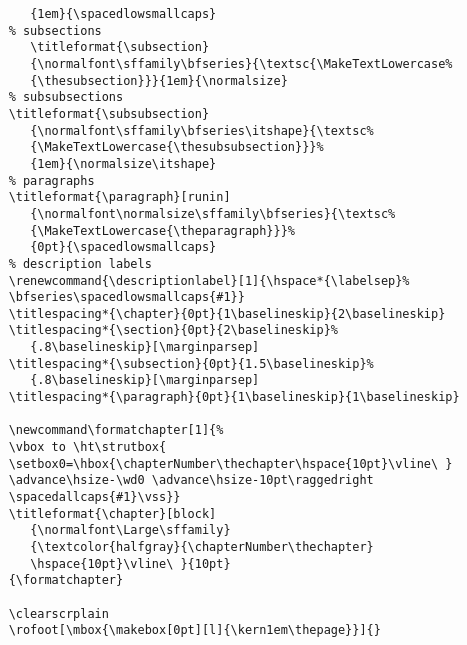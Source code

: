 \begin{lstlisting}
       {1em}{\spacedlowsmallcaps}
    % subsections
       \titleformat{\subsection}
       {\normalfont\sffamily\bfseries}{\textsc{\MakeTextLowercase%
       {\thesubsection}}}{1em}{\normalsize}
    % subsubsections
    \titleformat{\subsubsection}
       {\normalfont\sffamily\bfseries\itshape}{\textsc%
       {\MakeTextLowercase{\thesubsubsection}}}%
       {1em}{\normalsize\itshape}
    % paragraphs
    \titleformat{\paragraph}[runin]
       {\normalfont\normalsize\sffamily\bfseries}{\textsc%
       {\MakeTextLowercase{\theparagraph}}}%
       {0pt}{\spacedlowsmallcaps}
    % description labels
    \renewcommand{\descriptionlabel}[1]{\hspace*{\labelsep}%
    \bfseries\spacedlowsmallcaps{#1}}
    \titlespacing*{\chapter}{0pt}{1\baselineskip}{2\baselineskip}
    \titlespacing*{\section}{0pt}{2\baselineskip}%
       {.8\baselineskip}[\marginparsep]
    \titlespacing*{\subsection}{0pt}{1.5\baselineskip}%
       {.8\baselineskip}[\marginparsep]
    \titlespacing*{\paragraph}{0pt}{1\baselineskip}{1\baselineskip}

    \newcommand\formatchapter[1]{%
    \vbox to \ht\strutbox{
    \setbox0=\hbox{\chapterNumber\thechapter\hspace{10pt}\vline\ }
    \advance\hsize-\wd0 \advance\hsize-10pt\raggedright
    \spacedallcaps{#1}\vss}}
    \titleformat{\chapter}[block]
       {\normalfont\Large\sffamily}
       {\textcolor{halfgray}{\chapterNumber\thechapter}
       \hspace{10pt}\vline\ }{10pt}
    {\formatchapter}

    \clearscrplain
    \rofoot[\mbox{\makebox[0pt][l]{\kern1em\thepage}}]{}
\end{lstlisting}




